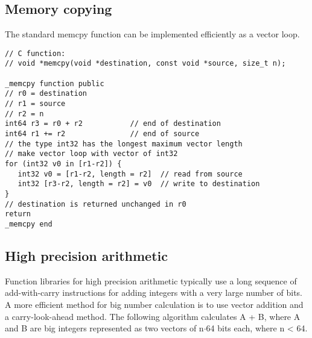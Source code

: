 \documentclass[forwardcom.tex]{subfiles}
\begin{document}
\subsection{Memory copying} \label{memcpy}
The standard memcpy function can be implemented efficiently as a vector loop.

\begin{example}
\label{exampleMemcpy}
\end{example}
\begin{lstlisting}[frame=single]
// C function:
// void *memcpy(void *destination, const void *source, size_t n);

_memcpy function public
// r0 = destination
// r1 = source
// r2 = n
int64 r3 = r0 + r2           // end of destination
int64 r1 += r2               // end of source
// the type int32 has the longest maximum vector length
// make vector loop with vector of int32
for (int32 v0 in [r1-r2]) {
   int32 v0 = [r1-r2, length = r2]  // read from source
   int32 [r3-r2, length = r2] = v0  // write to destination
}
// destination is returned unchanged in r0
return
_memcpy end   
\end{lstlisting}
\vspace{4mm}


\subsection{High precision arithmetic} \label{highPrecisionArithmetic}
Function libraries for high precision arithmetic typically use a long sequence of add-with-carry instructions for adding integers with a very large number of bits. A more efficient method for big number calculation is to use vector addition and a carry-look-ahead method. The following algorithm calculates A + B, where A and B are big integers represented as two vectors of n$\cdot$64 bits each, where n \textless{} 64.
\vspace{2mm}
\end{document}
